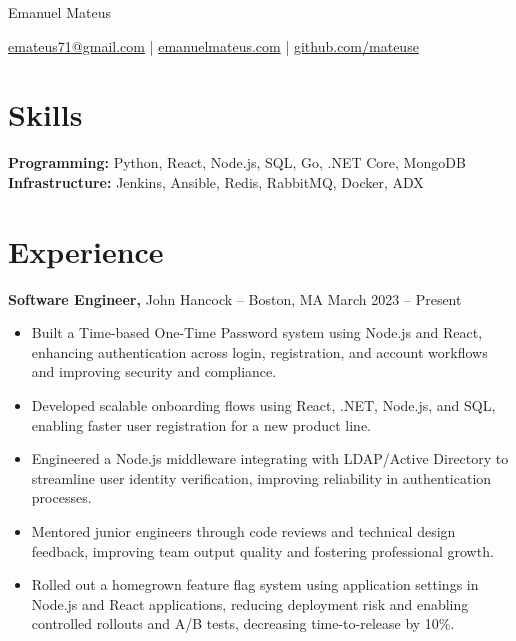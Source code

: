 \documentclass[11pt]{article}       %
\begin{document}
\centerline{\Huge Emanuel Mateus}

\vspace{5pt}

\centerline{\href{mailto:emateus71@gmail.com}{emateus71@gmail.com} | \href{https://emanuelmateus.com}{emanuelmateus.com} | \href{https://github.com/Mateuse}{github.com/mateuse}}

\vspace{-10pt}

\section*{Skills}
\textbf{Programming:} Python, React, Node.js, SQL, Go, .NET Core, MongoDB \\
\textbf{Infrastructure:} Jenkins, Ansible, Redis, RabbitMQ, Docker, ADX

\vspace{-10pt}

\section*{Experience}
\textbf{Software Engineer,} {John Hancock} -- Boston, MA \hfill March 2023 -- Present \\
\vspace{-9pt}
\begin{itemize}
  \item Built a Time-based One-Time Password system using Node.js and React, enhancing authentication across login, registration, and account workflows and improving security and compliance.
  \item Developed scalable onboarding flows using React, .NET, Node.js, and SQL, enabling faster user registration for a new product line.
  \item Engineered a Node.js middleware integrating with LDAP/Active Directory to streamline user identity verification, improving reliability in authentication processes.
  \item Mentored junior engineers through code reviews and technical design feedback, improving team output quality and fostering professional growth.
  \item Rolled out a homegrown feature flag system using application settings in Node.js and React applications, reducing deployment risk and enabling controlled rollouts and A/B tests, decreasing time-to-release by 10\%.
\end{itemize}
\end{document}
